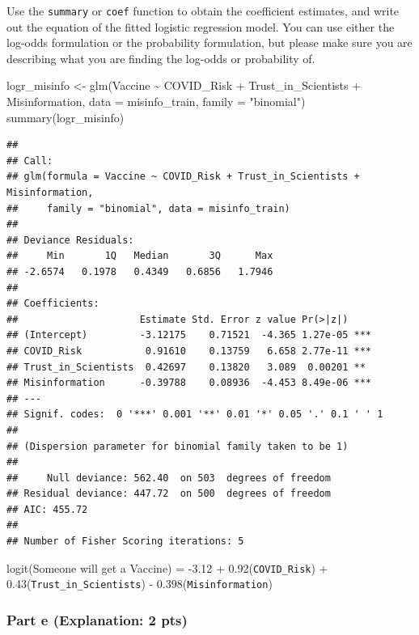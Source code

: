 \documentclass[
]{article}
\newenvironment{Shaded}{\begin{snugshade}}{\end{snugshade}}
\newcommand{\AttributeTok}[1]{\textcolor[rgb]{0.77,0.63,0.00}{#1}}
\newcommand{\FunctionTok}[1]{\textcolor[rgb]{0.00,0.00,0.00}{#1}}
\newcommand{\NormalTok}[1]{#1}
\newcommand{\OtherTok}[1]{\textcolor[rgb]{0.56,0.35,0.01}{#1}}
\newcommand{\SpecialCharTok}[1]{\textcolor[rgb]{0.00,0.00,0.00}{#1}}
\newcommand{\StringTok}[1]{\textcolor[rgb]{0.31,0.60,0.02}{#1}}
\begin{document}
Use the \texttt{summary} or \texttt{coef} function to obtain the
coefficient estimates, and write out the equation of the fitted logistic
regression model. You can use either the log-odds formulation or the
probability formulation, but please make sure you are describing what
you are finding the log-odds or probability of.

\begin{Shaded}
\begin{Highlighting}[]
\NormalTok{logr\_misinfo }\OtherTok{\textless{}{-}} \FunctionTok{glm}\NormalTok{(Vaccine }\SpecialCharTok{\textasciitilde{}}\NormalTok{ COVID\_Risk }\SpecialCharTok{+}\NormalTok{ Trust\_in\_Scientists }\SpecialCharTok{+}\NormalTok{ Misinformation, }
                  \AttributeTok{data =}\NormalTok{ misinfo\_train, }\AttributeTok{family =} \StringTok{"binomial"}\NormalTok{)}
\FunctionTok{summary}\NormalTok{(logr\_misinfo)}
\end{Highlighting}
\end{Shaded}

\begin{verbatim}
## 
## Call:
## glm(formula = Vaccine ~ COVID_Risk + Trust_in_Scientists + Misinformation, 
##     family = "binomial", data = misinfo_train)
## 
## Deviance Residuals: 
##     Min       1Q   Median       3Q      Max  
## -2.6574   0.1978   0.4349   0.6856   1.7946  
## 
## Coefficients:
##                     Estimate Std. Error z value Pr(>|z|)    
## (Intercept)         -3.12175    0.71521  -4.365 1.27e-05 ***
## COVID_Risk           0.91610    0.13759   6.658 2.77e-11 ***
## Trust_in_Scientists  0.42697    0.13820   3.089  0.00201 ** 
## Misinformation      -0.39788    0.08936  -4.453 8.49e-06 ***
## ---
## Signif. codes:  0 '***' 0.001 '**' 0.01 '*' 0.05 '.' 0.1 ' ' 1
## 
## (Dispersion parameter for binomial family taken to be 1)
## 
##     Null deviance: 562.40  on 503  degrees of freedom
## Residual deviance: 447.72  on 500  degrees of freedom
## AIC: 455.72
## 
## Number of Fisher Scoring iterations: 5
\end{verbatim}

logit(Someone will get a Vaccine) = -3.12 + 0.92(\texttt{COVID\_Risk}) +
0.43(\texttt{Trust\_in\_Scientists}) - 0.398(\texttt{Misinformation})

\hypertarget{part-e-explanation-2-pts}{%
\subsubsection{Part e (Explanation: 2
pts)}\label{part-e-explanation-2-pts}}
\end{document}
